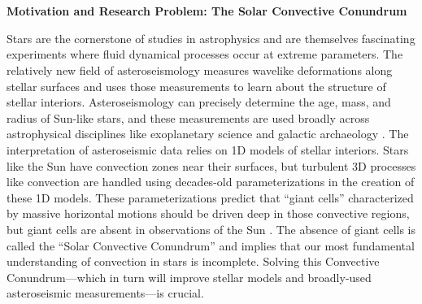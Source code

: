\documentclass[onecolumn, 11pt, hmargin=1in, vmargin=1in]{aastex62}
\begin{document}
\section*{}
\thispagestyle{fancy}

\begin{center}
\vspace{-1in}
\textbf{Motivation and Research Problem: The Solar Convective Conundrum}
\vspace{-8pt}
\end{center}

Stars are the cornerstone of studies in astrophysics and are themselves fascinating experiments where fluid dynamical processes occur at extreme parameters.
The relatively new field of asteroseismology measures wavelike deformations along stellar surfaces and uses those measurements to learn about the structure of stellar interiors.
Asteroseismology can precisely determine the age, mass, and radius of Sun-like stars, and these measurements are used broadly across astrophysical disciplines like exoplanetary science and galactic archaeology \citep{huber&all2019}.
The interpretation of asteroseismic data relies on 1D models of stellar interiors.
Stars like the Sun have convection zones near their surfaces, but turbulent 3D processes like convection are handled using decades-old parameterizations \citep[e.g.,][]{bohm-vitense1958} in the creation of these 1D models.
These parameterizations predict that ``giant cells'' characterized by massive horizontal motions should be driven deep in those convective regions, but giant cells are absent in observations of the Sun \citep{hanasoge&all2015}.
The absence of giant cells is called the ``Solar Convective Conundrum'' and implies that our most fundamental understanding of convection in stars is incomplete.
Solving this Convective Conundrum---which in turn will improve stellar models and broadly-used asteroseismic measurements---is crucial.
\end{document}

